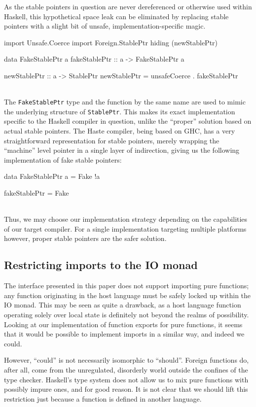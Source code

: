 \documentclass{sigplanconf}
\begin{document}
As the stable pointers in question are never dereferenced or otherwise
used within Haskell, this hypothetical space leak can be eliminated by
replacing stable pointers with a slight bit of unsafe, implementation-specific
magic.\\
\begin{code}
  import Unsafe.Coerce
  import Foreign.StablePtr hiding (newStablePtr)

  data FakeStablePtr a
  fakeStablePtr :: a -> FakeStablePtr a

  newStablePtr :: a -> StablePtr
  newStablePtr = unsafeCoerce . fakeStablePtr
\end{code}\\
The \lstinline!FakeStablePtr! type and the function by the same name are used
to mimic the underlying structure of \lstinline!StablePtr!. This makes its
exact implementation specific to the Haskell compiler in question, unlike
the ``proper'' solution based on actual stable pointers. The Haste
compiler, being based on GHC, has a very straightforward representation for
stable pointers, merely wrapping the ``machine'' level pointer in a single
layer of indirection, giving us the following implementation of fake stable
pointers:\\
\begin{code}
  data FakeStablePtr a = Fake !a

  fakeStablePtr = Fake
\end{code}\\
Thus, we may choose our implementation strategy depending on the capabilities
of our target compiler. For a single implementation targeting multiple
platforms however, proper stable pointers are the safer solution.

\subsection{Restricting imports to the IO monad}
The interface presented in this paper does not support importing pure
functions; any function originating in the host language must be safely locked
up within the IO monad. This may be seen as quite a drawback, as a host
language function operating solely over local state is definitely not
beyond the realms of possibility. Looking at our implementation of function
exports for pure functions, it seems that it would be possible to implement
imports in a similar way, and indeed we could.

However, ``could'' is not necessarily isomorphic to ``should''.
Foreign functions do, after all, come from the unregulated, disorderly world
outside the confines of the type checker. Haskell's type system does not
allow us to mix pure functions with possibly impure ones, and for good
reason. It is not clear that we should lift this
restriction just because a function is defined in another language.
\end{document}
